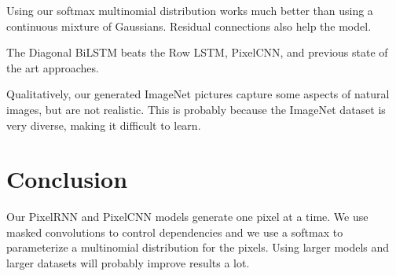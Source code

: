 \documentclass[a4paper]{article}
\begin{document}
Using our softmax multinomial distribution works much better than using a
continuous mixture of Gaussians. Residual connections also help the model.

The Diagonal BiLSTM beats the Row LSTM, PixelCNN, and previous state of the
art approaches.

Qualitatively, our generated ImageNet pictures capture some aspects of natural
images, but are not realistic. This is probably because the ImageNet dataset
is very diverse, making it difficult to learn.

\section{Conclusion}
Our PixelRNN and PixelCNN models generate one pixel at a time. We use masked
convolutions to control dependencies and we use a softmax to parameterize a
multinomial distribution for the pixels. Using larger models and larger datasets
will probably improve results a lot.
\end{document}
